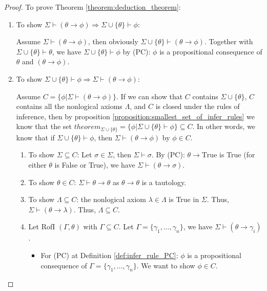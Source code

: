 \documentclass[11pt,letterpaper]{book}
\theoremstyle{definition}
\begin{document}
\begin{proof}


To prove Theorem \ref{theorem:deduction_theorem}:
\begin{enumerate}
\item{To show $\Sigma \vdash (\theta \rightarrow \phi) \Rightarrow
\Sigma \cup \{ \theta \} \vdash \phi $:

Assume $\Sigma \vdash (\theta \rightarrow \phi)$, then obviously $\Sigma
\cup \{ \theta \} \vdash (\theta \rightarrow \phi)$. Together with
$\Sigma \cup \{\theta \} \vdash \theta$, we have $\Sigma \cup \{ \theta
\} \vdash \phi$ by (PC): $\phi$ is a propositional consequence of
$\theta$ and $(\theta \rightarrow \phi)$.
}
\item{To show $\Sigma \cup \{ \theta \} \vdash \phi \Rightarrow \Sigma
\vdash (\theta \rightarrow \phi)$:

Assume $C = \{ \phi | \Sigma \vdash (\theta \rightarrow \phi) \}$. If we
can show that $C$ contains $\Sigma \cup \{ \theta \}$, $C$ contains all
the nonlogical axioms $\Lambda$, and $C$ is closed under the rules of 
inference,
then by proposition \ref{proposition:smallest_set_of_infer_rules} we
know that the set $theorem_{\Sigma \cup \{ \theta \}} = \{ \phi | \Sigma
\cup \{ \theta \} \vdash \phi \} \subseteq C$. In other words, we know
that if $\Sigma \cup \{ \theta \} \vdash \phi$, then $\Sigma \vdash
(\theta \rightarrow \phi )$ by $\phi \in C$.}
\begin{enumerate}
\item{To show $\Sigma \subseteq C$: Let $\sigma \in \Sigma$, then
$\Sigma \vdash \sigma$. By (PC): $\theta \rightarrow \text{True} $ is
True (for either $\theta $ is False or True), we have $\Sigma \vdash
(\theta \rightarrow \sigma)$.}
\item{To show $\theta \in C$: $\Sigma \vdash \theta \rightarrow \theta$
as $\theta \rightarrow \theta$ is a tautology.}
\item{To show $\Lambda \subseteq C$: the nonlogical axiom $\lambda \in 
\Lambda$ is True in
$\Sigma$. Thus, $\Sigma \vdash (\theta \rightarrow \lambda)$. Thus,
$\Lambda \subseteq C$.}
\item{Let RofI $(\Gamma , \theta)$ with $\Gamma \subseteq C$. Let
$\Gamma = \{ \gamma_1, \ldots, \gamma_n \}$, we have $\Sigma \vdash
(\theta \rightarrow \gamma_i)$.}
\begin{itemize}
\item{For (PC) at Definition \ref{def:infer_rule_PC}: $\phi$ is a
propositional consequence of $\Gamma = \{ \gamma_1, \ldots, \gamma_n
\}$. We want to show $\phi \in C$.

}
\end{itemize}
\end{enumerate}
\end{enumerate}
\end{proof}
\end{document}
